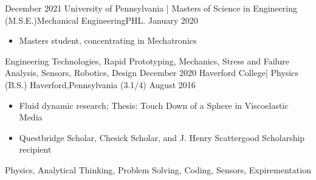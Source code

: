 %
%
%


\begin{experiences}
 \experience
    {December 2021}   {University of Pennsylvania | Masters of Science in Engineering (M.S.E.)}{Mechanical Engineering}{PHL.}
    {January 2020} {
                      \begin{itemize}
                        \item Masters student, concentrating in Mechatronics                                                                              
                      \end{itemize}
                    }
                     {Engineering Technologies, Rapid Prototyping, Mechanics, Stress and Failure Analysis, Sensors, Robotics, Design}
  \emptySeparator
  \experience
    {December 2020}   {Haverford College| Physics (B.S.) }{Haverford,Pennsylvania }{(3.1/4)}
    {August 2016} {
                      \begin{itemize}
    			    \item Fluid dynamic research; Thesis: Touch Down of a Sphere in Viscoelastic Media     	
                        \item Questbridge Scholar, Chesick Scholar, and  J. Henry Scattergood Scholarship recipient                                                        
                      \end{itemize}
                    }
                     {Physics, Analytical Thinking, Problem Solving, Coding, Sensors, Expirementation}
  \emptySeparator
 
\end{experiences}

